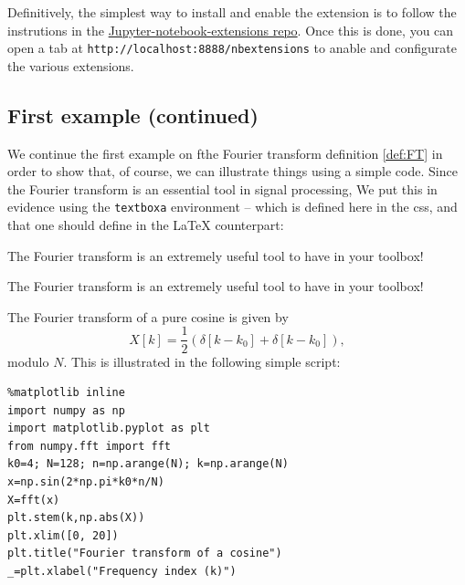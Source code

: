 Definitively, the simplest way to install and enable the extension is to
follow the instrutions in the
\href{https://github.com/ipython-contrib/Jupyter-notebook-extensions/blob/master/README.md}{Jupyter-notebook-extensions
repo}. Once this is done, you can open a tab at
\texttt{http://localhost:8888/nbextensions} to anable and configurate
the various extensions.

    \subsection{First example (continued)}\label{first-example-continued}

    We continue the first example on fthe Fourier transform definition
\ref{def:FT} in order to show that, of course, we can illustrate things
using a simple code. Since the Fourier transform is an essential tool in
signal processing, We put this in evidence using the \texttt{textboxa}
environment -- which is defined here in the css, and that one should
define in the LaTeX counterpart:

\begin{listing}
\begin{textboxa}
The Fourier transform is an extremely useful tool to have in your toolbox!
\end{textboxa}
\end{listing}

    \begin{textboxa}
The Fourier transform is an extremely useful tool to have in your toolbox!
\end{textboxa}

    The Fourier transform of a pure cosine is given by \[
X[k] = \frac{1}{2} \left( \delta[k-k_0] + \delta[k-k_0] \right), 
\] modulo \(N\). This is illustrated in the following simple script:
\begin{lstlisting}
%matplotlib inline
import numpy as np
import matplotlib.pyplot as plt 
from numpy.fft import fft
k0=4; N=128; n=np.arange(N); k=np.arange(N)
x=np.sin(2*np.pi*k0*n/N)
X=fft(x)
plt.stem(k,np.abs(X))
plt.xlim([0, 20])
plt.title("Fourier transform of a cosine")
_=plt.xlabel("Frequency index (k)")
\end{lstlisting}%
%
    \begin{center}
    \end{center}
    
